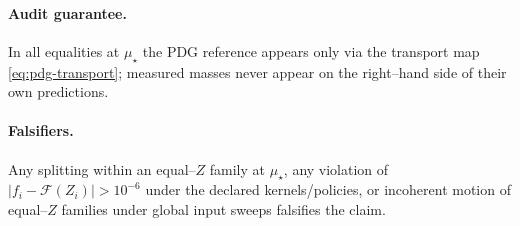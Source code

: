 \documentclass[epjc3]{svjour3}
\begin{document}
\paragraph{Audit guarantee.} In all equalities at $\mu_\star$ the PDG reference appears only via the transport map \eqref{eq:pdg-transport}; measured masses never appear on the right–hand side of their own predictions.


\paragraph{Falsifiers.}
Any splitting within an equal–$Z$ family at $\mu_\star$, any violation of $|f_i-\mathcal F(Z_i)|>10^{-6}$ under the declared kernels/policies, or incoherent motion of equal–$Z$ families under global input sweeps falsifies the claim.
\end{document}
